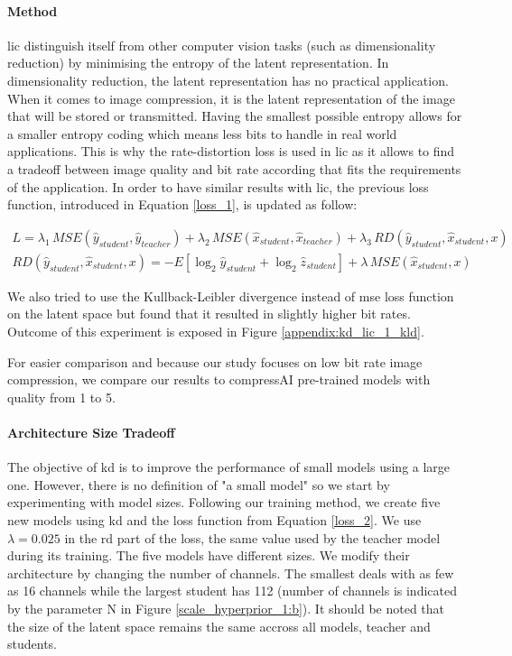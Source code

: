 \documentclass{article}
\begin{document}
\paragraph{Method}
\acrshort{lic} distinguish itself from other computer vision tasks (such as dimensionality reduction) by minimising the entropy of the latent representation. In dimensionality reduction, the latent representation has no practical application. When it comes to image compression, it is the latent representation of the image that will be stored or transmitted. Having the smallest possible entropy allows for a smaller entropy coding which means less bits to handle in real world applications. This is why the rate-distortion loss is used in \acrshort{lic} as it allows to find a tradeoff between image quality and bit rate according that fits the requirements of the application. In order to have similar results with \acrshort{lic}, the previous loss function, introduced in Equation \eqref{loss_1}, is updated as follow:

\begin{align}
    L = \lambda_{1}\, MSE(\hat{y}_{student}, \hat{y}_{teacher}) + \lambda_{2}\, MSE(\hat{x}_{student}, \hat{x}_{teacher}) + \lambda_{3}\, RD(\hat{y}_{student}, \hat{x}_{student}, x)\label{loss_2}\\
    RD(\hat{y}_{student}, \hat{x}_{student}, x) = -E[\log_{2}\hat{y}_{student} + \log_{2}\hat{z}_{student}] + \lambda\, MSE(\hat{x}_{student}, x)
\end{align}

We also tried to use the Kullback-Leibler divergence instead of \acrshort{mse} loss function on the latent space but found that it resulted in slightly higher bit rates. Outcome of this experiment is exposed in Figure \ref{appendix:kd_lic_1_kld}.

For easier comparison and because our study focuses on low bit rate image compression, we compare our results to compressAI pre-trained models with \textsf{quality} from 1 to 5.

\paragraph{Architecture Size Tradeoff}
\label{architecture_size_tradeoff}
The objective of \acrshort{kd} is to improve the performance of small models using a large one. However, there is no definition of "a small model" so we start by experimenting with model sizes. Following our training method, we create five new models using \acrshort{kd} and the loss function from Equation \ref{loss_2}. We use \(\lambda = 0.025\) in the \acrshort{rd} part of the loss, the same value used by the teacher model during its training. The five models have different sizes. We modify their architecture by changing the number of channels. The smallest deals with as few as 16 channels while the largest student has 112 (number of channels is indicated by the parameter N in Figure \ref{scale_hyperprior_1:b}). It should be noted that the size of the latent space remains the same accross all models, teacher and students.
\end{document}
